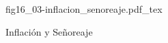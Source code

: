 \begin{figure}[h]
\centering
\def\svgwidth{0.5\textwidth}
{fig16_03-inflacion_senoreaje.pdf_tex}
\caption{Inflación y Señoreaje}
\label{fig16_03-inflacion_senoreaje}
\end{figure}